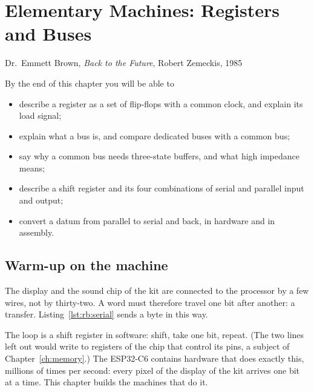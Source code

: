 \chapter{Elementary Machines: Registers and Buses}
\label{ch:registers}

  {Dr.\ Emmett Brown, \emph{Back to the Future}, Robert Zemeckis, 1985}

\begin{chapgoals}
By the end of this chapter you will be able to
\begin{itemize}
\item describe a register as a set of flip-flops with a common clock, and explain its load signal;
\item explain what a bus is, and compare dedicated buses with a common bus;
\item say why a common bus needs three-state buffers, and what high impedance means;
\item describe a shift register and its four combinations of serial and parallel input and output;
\item convert a datum from parallel to serial and back, in hardware and in \riscv assembly.
\end{itemize}
\end{chapgoals}


\section{Warm-up on the machine}

The display and the sound chip of the kit are connected to the processor by a
few wires, not by thirty-two. A word must therefore travel one bit after
another: a  transfer. Listing~\ref{lst:rb:serial} sends a byte
in this way.


The loop is a shift register in software: shift, take one bit, repeat. (The
two lines left out would write to registers of the chip that control its
pins, a subject of Chapter~\ref{ch:memory}.) The ESP32-C6 contains hardware
that does exactly this, millions of times per second: every pixel of the
display of the kit arrives one bit at a time. This chapter builds the
machines that do it.

